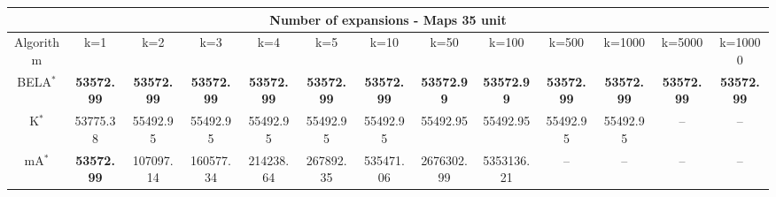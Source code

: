 \begin{tabular}{c|cccccccccccc}\toprule
\multicolumn{13}{c}{Number of expansions - Maps 35 unit}\\ \midrule
Algorithm & k=1 & k=2 & k=3 & k=4 & k=5 & k=10 & k=50 & k=100 & k=500 & k=1000 & k=5000 & k=10000 \\ \midrule
BELA$^*$ & \textbf{53572.99} & \textbf{53572.99} & \textbf{53572.99} & \textbf{53572.99} & \textbf{53572.99} & \textbf{53572.99} & \textbf{53572.99} & \textbf{53572.99} & \textbf{53572.99} & \textbf{53572.99} & \textbf{53572.99} & \textbf{53572.99} \\
K$^*$ & 53775.38 & 55492.95 & 55492.95 & 55492.95 & 55492.95 & 55492.95 & 55492.95 & 55492.95 & 55492.95 & 55492.95 & -- & -- \\
mA$^*$ & \textbf{53572.99} & 107097.14 & 160577.34 & 214238.64 & 267892.35 & 535471.06 & 2676302.99 & 5353136.21 & -- & -- & -- & -- \\ \bottomrule 
\end{tabular}
